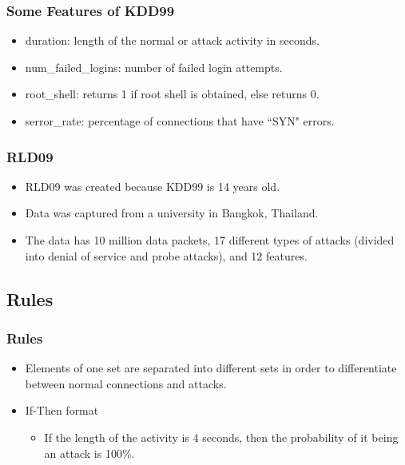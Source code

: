 \documentclass{beamer}
\begin{document}
\begin{frame}
  \frametitle{Some Features of KDD99}
	\begin{itemize}
		\item duration: length of the normal or attack activity
in seconds.
		\item num\_failed\_logins: number of failed login attempts.
		\item root\_shell: returns 1 if root shell is obtained, else returns 0.
		\item serror\_rate: percentage of connections that have ``SYN" errors.
	\end{itemize}
\end{frame}



\begin{frame}
  \frametitle{RLD09}
	\begin{itemize}
		\item RLD09 was created because KDD99 is 14 years old.
		\item Data was captured from a university in Bangkok, Thailand.
		\item The data has 10 million data packets, 17 different types of attacks (divided into denial of service and probe attacks), and 12 features.
	\end{itemize}
\end{frame}


\subsection{Rules}
\begin{frame}
  \frametitle{Rules}
	\begin{itemize}
		\item Elements of one set are separated into different sets in order to differentiate between normal connections and attacks.
		\item If-Then format
		\begin{itemize}
			\item If the length of the activity is 4 seconds, then the probability of it being an attack is 100\%.
		\end{itemize}				
	\end{itemize}
\end{frame}
\end{document}
